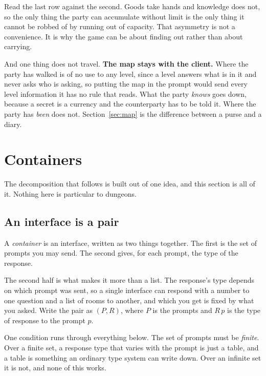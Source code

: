 \documentclass[11pt,a4paper]{article}
\begin{document}
\begin{sectionbox}
Read the last row against the second. Goods take hands and knowledge does not, so the only thing
the party can accumulate without limit is the only thing it cannot be robbed of by running out of
capacity. That asymmetry is not a convenience. It is why the game can be about finding out rather
than about carrying.
\end{sectionbox}

\begin{alarmbox}
And one thing does not travel. \textbf{The map stays with the client.} Where the party has walked
is of no use to any level, since a level answers what is in it and never asks who is asking, so
putting the map in the prompt would send every level information it has no rule that reads. What
the party \emph{knows} goes down, because a secret is a currency and the counterparty has to be
told it. Where the party has \emph{been} does not. Section~\ref{sec:map} is the difference between
a purse and a diary.
\end{alarmbox}


\section{Containers}
\label{sec:containers}

The decomposition that follows is built out of one idea, and this section is all of it. Nothing
here is particular to dungeons.

\subsection{An interface is a pair}

A \emph{container} is an interface, written as two things together. The first is the set of
prompts you may send. The second gives, for each prompt, the type of the response.

The second half is what makes it more than a list. The response's type depends on which prompt was
sent, so a single interface can respond with a number to one question and a list of rooms to
another, and which you get is fixed by what you asked. Write the pair as $(P, R)$, where $P$ is
the prompts and $R\,p$ is the type of response to the prompt $p$.

One condition runs through everything below. The set of prompts must be \emph{finite}. Over a
finite set, a response type that varies with the prompt is just a table, and a table is something an
ordinary type system can write down. Over an infinite set it is not, and none of this works.
\end{document}
